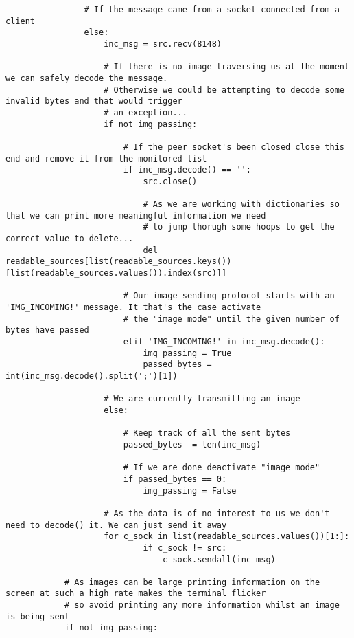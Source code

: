 \documentclass[landscape]{article}
\begin{document}
\begin{verbatim}
                # If the message came from a socket connected from a client
                else:
                    inc_msg = src.recv(8148)

                    # If there is no image traversing us at the moment we can safely decode the message.
                    # Otherwise we could be attempting to decode some invalid bytes and that would trigger
                    # an exception...
                    if not img_passing:

                        # If the peer socket's been closed close this end and remove it from the monitored list
                        if inc_msg.decode() == '':
                            src.close()

                            # As we are working with dictionaries so that we can print more meaningful information we need
                            # to jump thorugh some hoops to get the correct value to delete...
                            del readable_sources[list(readable_sources.keys())[list(readable_sources.values()).index(src)]]

                        # Our image sending protocol starts with an 'IMG_INCOMING!' message. It that's the case activate
                        # the "image mode" until the given number of bytes have passed
                        elif 'IMG_INCOMING!' in inc_msg.decode():
                            img_passing = True
                            passed_bytes = int(inc_msg.decode().split(';')[1])

                    # We are currently transmitting an image
                    else:

                        # Keep track of all the sent bytes
                        passed_bytes -= len(inc_msg)

                        # If we are done deactivate "image mode"
                        if passed_bytes == 0:
                            img_passing = False
                    
                    # As the data is of no interest to us we don't need to decode() it. We can just send it away
                    for c_sock in list(readable_sources.values())[1:]:
                            if c_sock != src:
                                c_sock.sendall(inc_msg)

            # As images can be large printing information on the screen at such a high rate makes the terminal flicker
            # so avoid printing any more information whilst an image is being sent
            if not img_passing:


\end{verbatim}
\end{document}

